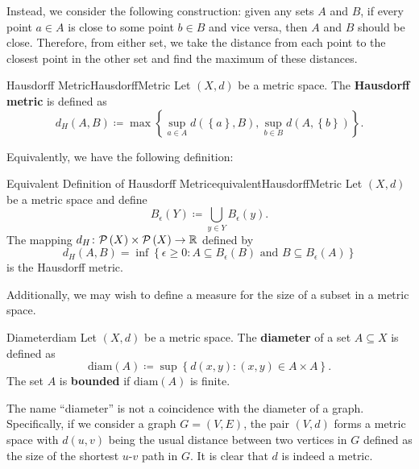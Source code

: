\documentclass[math]{amznotes}
\theoremstyle{remark}
\begin{document}
Instead, we consider the following construction: given any sets $A$ and $B$, if every point $a \in A$ is close to some point $b \in B$ and vice versa, then $A$ and $B$ should be close. Therefore, from either set, we take the distance from each point to the closest point in the other set and find the maximum of these distances.
\begin{dfnbox}{Hausdorff Metric}{HausdorffMetric}
    Let $\left(X, d\right)$ be a metric space. The {\color{red} \textbf{Hausdorff metric}} is defined as 
    \begin{equation*}
        d_H\left(A, B\right) \coloneqq \max\left\{\sup_{a \in A}d\left(\left\{a\right\}, B\right), \sup_{b \in B}d\left(A, \left\{b\right\}\right)\right\}.
    \end{equation*}
\end{dfnbox}
Equivalently, we have the following definition:
\begin{thmbox}{Equivalent Definition of Hausdorff Metric}{equivalentHausdorffMetric}
    Let $\left(X, d\right)$ be a metric space and define 
    \begin{equation*}
        B_{\epsilon}\left(Y\right) \coloneqq \bigcup_{y \in Y}B_{\epsilon}\left(y\right).
    \end{equation*}
    The mapping $d_H \colon \mathcal{P}\left(X\right) \times \mathcal{P}\left(X\right) \to \mathbb{R}$ defined by 
    \begin{equation*}
        d_H\left(A, B\right) = \inf \left\{ \epsilon \geq 0 : A \subseteq B_\epsilon(B) \text{ and } B \subseteq B_\epsilon(A) \right\}
    \end{equation*}
    is the Hausdorff metric.
\end{thmbox}
Additionally, we may wish to define a measure for the size of a subset in a metric space.
\begin{dfnbox}{Diameter}{diam}
    Let $\left(X, d\right)$ be a metric space. The {\color{red} \textbf{diameter}} of a set $A \subseteq X$ is defined as 
    \begin{equation*}
        \mathrm{diam}\left(A\right) \coloneqq \sup\left\{d\left(x, y\right) \colon \left(x, y\right) \in A \times A\right\}.
    \end{equation*}
    The set $A$ is {\color{red} \textbf{bounded}} if $\mathrm{diam}\left(A\right)$ is finite.
\end{dfnbox}
The name ``diameter'' is not a coincidence with the diameter of a graph. Specifically, if we consider a graph $G = \left(V, E\right)$, the pair $\left(V, d\right)$ forms a metric space with $d\left(u, v\right)$ being the usual distance between two vertices in $G$ defined as the size of the shortest $u$-$v$ path in $G$. It is clear that $d$ is indeed a metric.
\end{document}
